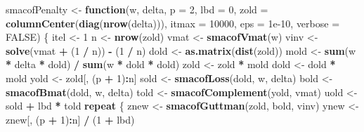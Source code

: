 \documentclass[
  12pt,
]{article}
\newenvironment{Shaded}{\begin{snugshade}}{\end{snugshade}}
\newcommand{\AttributeTok}[1]{\textcolor[rgb]{0.13,0.29,0.53}{#1}}
\newcommand{\ConstantTok}[1]{\textcolor[rgb]{0.56,0.35,0.01}{#1}}
\newcommand{\ControlFlowTok}[1]{\textcolor[rgb]{0.13,0.29,0.53}{\textbf{#1}}}
\newcommand{\DecValTok}[1]{\textcolor[rgb]{0.00,0.00,0.81}{#1}}
\newcommand{\FloatTok}[1]{\textcolor[rgb]{0.00,0.00,0.81}{#1}}
\newcommand{\FunctionTok}[1]{\textcolor[rgb]{0.13,0.29,0.53}{\textbf{#1}}}
\newcommand{\NormalTok}[1]{#1}
\newcommand{\OtherTok}[1]{\textcolor[rgb]{0.56,0.35,0.01}{#1}}
\newcommand{\SpecialCharTok}[1]{\textcolor[rgb]{0.81,0.36,0.00}{\textbf{#1}}}
\begin{document}
\begin{Shaded}
\begin{Highlighting}[]
\NormalTok{smacofPenalty }\OtherTok{\textless{}{-}}
  \ControlFlowTok{function}\NormalTok{(w,}
\NormalTok{           delta,}
           \AttributeTok{p =} \DecValTok{2}\NormalTok{,}
           \AttributeTok{lbd =} \DecValTok{0}\NormalTok{,}
           \AttributeTok{zold =} \FunctionTok{columnCenter}\NormalTok{(}\FunctionTok{diag}\NormalTok{(}\FunctionTok{nrow}\NormalTok{(delta))),}
           \AttributeTok{itmax =} \DecValTok{10000}\NormalTok{,}
           \AttributeTok{eps =} \FloatTok{1e{-}10}\NormalTok{,}
           \AttributeTok{verbose =} \ConstantTok{FALSE}\NormalTok{) \{}
\NormalTok{    itel }\OtherTok{\textless{}{-}} \DecValTok{1}
\NormalTok{    n }\OtherTok{\textless{}{-}} \FunctionTok{nrow}\NormalTok{(zold)}
\NormalTok{    vmat }\OtherTok{\textless{}{-}} \FunctionTok{smacofVmat}\NormalTok{(w)}
\NormalTok{    vinv }\OtherTok{\textless{}{-}} \FunctionTok{solve}\NormalTok{(vmat }\SpecialCharTok{+}\NormalTok{ (}\DecValTok{1} \SpecialCharTok{/}\NormalTok{ n)) }\SpecialCharTok{{-}}\NormalTok{ (}\DecValTok{1} \SpecialCharTok{/}\NormalTok{ n)}
\NormalTok{    dold }\OtherTok{\textless{}{-}} \FunctionTok{as.matrix}\NormalTok{(}\FunctionTok{dist}\NormalTok{(zold))}
\NormalTok{    mold }\OtherTok{\textless{}{-}} \FunctionTok{sum}\NormalTok{(w }\SpecialCharTok{*}\NormalTok{ delta }\SpecialCharTok{*}\NormalTok{ dold) }\SpecialCharTok{/} \FunctionTok{sum}\NormalTok{(w }\SpecialCharTok{*}\NormalTok{ dold }\SpecialCharTok{*}\NormalTok{ dold)}
\NormalTok{    zold }\OtherTok{\textless{}{-}}\NormalTok{ zold }\SpecialCharTok{*}\NormalTok{ mold}
\NormalTok{    dold }\OtherTok{\textless{}{-}}\NormalTok{ dold }\SpecialCharTok{*}\NormalTok{ mold}
\NormalTok{    yold }\OtherTok{\textless{}{-}}\NormalTok{ zold[, (p }\SpecialCharTok{+} \DecValTok{1}\NormalTok{)}\SpecialCharTok{:}\NormalTok{n]}
\NormalTok{    sold }\OtherTok{\textless{}{-}} \FunctionTok{smacofLoss}\NormalTok{(dold, w, delta)}
\NormalTok{    bold }\OtherTok{\textless{}{-}} \FunctionTok{smacofBmat}\NormalTok{(dold, w, delta)}
\NormalTok{    told }\OtherTok{\textless{}{-}} \FunctionTok{smacofComplement}\NormalTok{(yold, vmat)}
\NormalTok{    uold }\OtherTok{\textless{}{-}}\NormalTok{ sold }\SpecialCharTok{+}\NormalTok{ lbd }\SpecialCharTok{*}\NormalTok{ told}
    \ControlFlowTok{repeat}\NormalTok{ \{}
\NormalTok{      znew }\OtherTok{\textless{}{-}} \FunctionTok{smacofGuttman}\NormalTok{(zold, bold, vinv)}
\NormalTok{      ynew }\OtherTok{\textless{}{-}}\NormalTok{ znew[, (p }\SpecialCharTok{+} \DecValTok{1}\NormalTok{)}\SpecialCharTok{:}\NormalTok{n] }\SpecialCharTok{/}\NormalTok{ (}\DecValTok{1} \SpecialCharTok{+}\NormalTok{ lbd)}

\end{Highlighting}
\end{Shaded}
\end{document}
